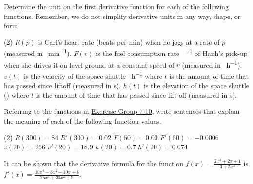 \documentclass[10pt,oneside,]{book}
\theoremstyle{plain}
\theoremstyle{definition}
\numberwithin{equation}{section}
\newcommand{\fe}[2]{#1\mathopen{}\left(#2\right)\mathclose{}}
\newcommand{\fd}[1]{#1'}
\begin{document}
\par\smallskip\noindent
\hypertarget{exercisegroup-derivative-units-supplement}{\null}Determine the unit on the first derivative function for each of the following functions.  Remember, we do not simplify derivative units in any way, shape, or form.%
\par
\begin{exercisegroup}(2)
\exercise[7.]\hypertarget{exercise-derivative-units-supplement-first}{\null}\(\fe{R}{p}\) is Carl's heart rate (beats per min) when he jogs at a rate of \(p\) (measured in \si{\foot\per\minute}).%
\exercise[8.]\hypertarget{exercise-208}{\null}\(\fe{F}{v}\) is the fuel consumption rate \si{\gallon\per\mile} of Hanh's pick-up when she drives it on level ground at a constant speed of \(v\) (measured in \si{\mile\per\hour}).%
\exercise[9.]\hypertarget{exercise-209}{\null}\(\fe{v}{t}\) is the velocity of the space shuttle  \si{\mile\per\hour} where \(t\) is the amount of time that has passed since liftoff (measured in \si{\second}).%
\exercise[10.]\hypertarget{exercise-derivative-units-supplement-last}{\null}\(\fe{h}{t}\) is the elevation of the space shuttle (\si{\mile}) where \(t\) is the amount of time that has passed since lift-off (measured in \si{\second}).%
\end{exercisegroup}
\par\smallskip\noindent
\hypertarget{exercisegroup-43}{\null}Referring to the functions in \hyperlink{exercisegroup-derivative-units-supplement}{Exercise Group 7-10}, write sentences that explain the meaning of each of the following function values.%
\par
\begin{exercisegroup}(2)
\exercise[11.]\hypertarget{exercise-211}{\null}\(\fe{R}{300}=84\)%
\exercise[12.]\hypertarget{exercise-212}{\null}\(\fe{\fd{R}}{300}=0.02\)%
\exercise[13.]\hypertarget{exercise-213}{\null}\(\fe{F}{50}=0.03\)%
\exercise[14.]\hypertarget{exercise-214}{\null}\(\fe{\fd{F}}{50}=-0.0006\)%
\exercise[15.]\hypertarget{exercise-215}{\null}\(\fe{v}{20}=266\)%
\exercise[16.]\hypertarget{exercise-216}{\null}\(\fe{\fd{v}}{20}=18.9\)%
\exercise[17.]\hypertarget{exercise-217}{\null}\(\fe{h}{20}=0.7\)%
\exercise[18.]\hypertarget{exercise-218}{\null}\(\fe{\fd{h}}{20}=0.074\)%
\end{exercisegroup}
\par\smallskip\noindent
\hypertarget{exercisegroup-44}{\null}It can be shown that the derivative formula for the function \(\fe{f}{x}=\frac{2x^3+2x+1}{3+5x^2}\) is \(\fe{\fd{f}}{x}=\frac{10x^4+8x^2-10x+6}{25x^4+30x^2+9}\).%
\end{document}
